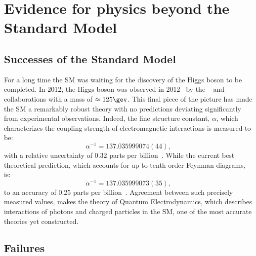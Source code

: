 \section{Evidence for physics beyond the Standard Model}

\subsection{Successes of the Standard Model}
For a long time the SM was waiting for the discovery of the Higgs boson to be completed.
In 2012, the Higgs boson was observed in 2012~\cite{Chatrchyan:2012ufa,Aad:2012tfa} by the
\cms~\cite{Chatrchyan:2012ufa} and \atlas~\cite{Aad:2012tfa} collaborations with a mass of
$\approx125\gev$.
This final piece of the picture has made the SM a remarkably robust theory with no predictions
deviating significantly from experimental observations.
Indeed, the fine structure constant, $\alpha$, which characterizes the coupling strength of
electromagnetic interactions
is measured to be:
\begin{equation}
  \alpha^{-1} = 137.035 999 074 (44),
\end{equation}
with a relative uncertainty of 0.32 parts per billion~\cite{PDG2012}.
While the current best theoretical prediction, which accounts for up to tenth order Feynman
diagrams, is:
\begin{equation}
  \alpha^{-1} = 137.035 999 073 (35),
\end{equation}
to an accuracy of 0.25 parts per billion~\cite{Aoyama:2012wj}.
Agreement between such precisely measured values, makes the theory of Quantum Electrodynamics,
which describes interactions of photons and charged particles in the SM, one of the most accurate
theories yet constructed.




\subsection{Failures}

